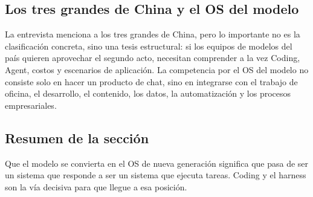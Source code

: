 \subsection{Los tres grandes de China y el OS del modelo}

La entrevista menciona a los tres grandes de China, pero lo importante no es la clasificación concreta, sino una tesis estructural: si los equipos de modelos del país quieren aprovechar el segundo acto, necesitan comprender a la vez Coding, Agent, costos y escenarios de aplicación. La competencia por el OS del modelo no consiste solo en hacer un producto de chat, sino en integrarse con el trabajo de oficina, el desarrollo, el contenido, los datos, la automatización y los procesos empresariales.

\subsection{Resumen de la sección}

Que el modelo se convierta en el OS de nueva generación significa que pasa de ser un sistema que responde a ser un sistema que ejecuta tareas. Coding y el harness son la vía decisiva para que llegue a esa posición.
